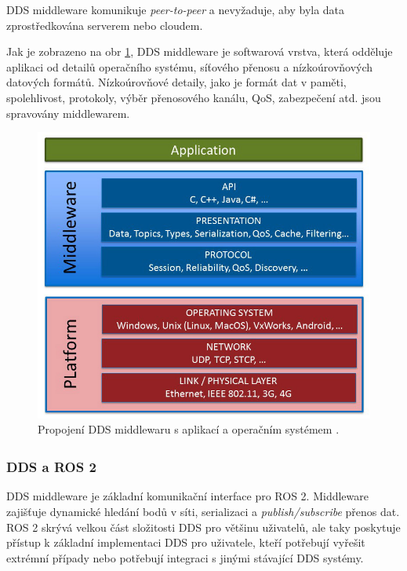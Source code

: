 \acs{DDS} middleware komunikuje \textit{peer-to-peer} a nevyžaduje, aby byla data zprostředkována serverem nebo cloudem. 

Jak je zobrazeno na obr \ref{fig:DDSmiddleware}, \acs{DDS} middleware je softwarová vrstva, která odděluje aplikaci od detailů operačního systému, síťového přenosu a nízkoúrovňových datových formátů. Nízkoúrovňové detaily, jako je formát dat v paměti, spolehlivost, protokoly, výběr přenosového kanálu, \acs{QoS}, zabezpečení atd. jsou spravovány middlewarem. 

\begin{figure}[!ht]
    \begin{center}
        \includegraphics[scale=0.43]{obrazky/DDS1}
    \end{center}
    \caption[Propojení \acs{DDS} middlewaru s aplikací a operačním systémem]{Propojení \acs{DDS} middlewaru s aplikací a operačním systémem \cite{DDS_Main}.}
    \label{fig:DDSmiddleware}
\end{figure}

\subsubsection{DDS\texorpdfstring{\textsuperscript{\textregistered}}{ (R)} a ROS 2}

\acs{DDS} middleware je základní komunikační interface pro ROS 2. Middleware zajišťuje dynamické hledání bodů v síti, serializaci a \textit{publish/subscribe} přenos dat. ROS 2 skrývá velkou část složitosti \acs{DDS} pro většinu uživatelů, ale taky poskytuje přístup k základní implementaci \acs{DDS} pro uživatele, kteří potřebují vyřešit extrémní případy nebo potřebují integraci s jinými stávající \acs{DDS} systémy. \cite{ROS2DDS}

